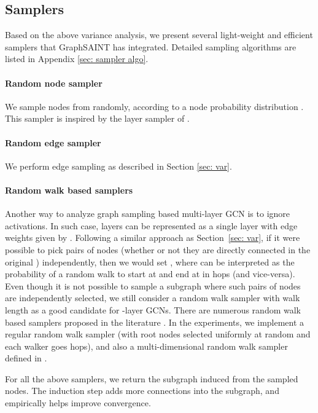 \documentclass{article} \usepackage{iclr2020_conference,times}
\newcommand{\graphsaint}{{\fontfamily{lmtt}\selectfont GraphSAINT}}
\begin{document}
\subsection{Samplers}
\label{sec: sampler}

Based on the above variance analysis, we present several light-weight and efficient samplers that {\graphsaint} has integrated. Detailed sampling algorithms are listed in Appendix \ref{sec: sampler algo}.

\paragraph{Random node sampler} 
We sample  nodes from  randomly, according to a node probability distribution . This sampler is inspired by the layer sampler of \cite{fastgcn}.


\paragraph{Random edge sampler} We perform edge sampling as described in Section \ref{sec: var}. 


\paragraph{Random walk based samplers} 
Another way to analyze graph sampling based multi-layer GCN is to ignore activations. In such case,  layers can be represented as a single layer with edge weights given by . Following a similar approach as Section~\ref{sec: var}, if it were possible to pick pairs of nodes (whether or not they are directly connected in the original ) independently, then we would set , where  can be interpreted as the probability of a random walk to start at  and end at  in  hops (and  vice-versa). Even though it is not possible to sample a subgraph where such pairs of nodes are independently selected, we still consider a random walk sampler with walk length  as a good candidate  for -layer GCNs. There are numerous random walk based samplers proposed in the literature \citep{frontier,forest-fire,sampler_survey, sampler_icde}. 
In the experiments, we implement a regular random walk sampler (with  root nodes selected uniformly at random and each walker goes  hops), and also a multi-dimensional random walk sampler defined in \cite{frontier}.





For all the above samplers, we return the subgraph induced from the sampled nodes. The induction step adds more connections into the subgraph, and empirically helps improve convergence. 
\end{document}
